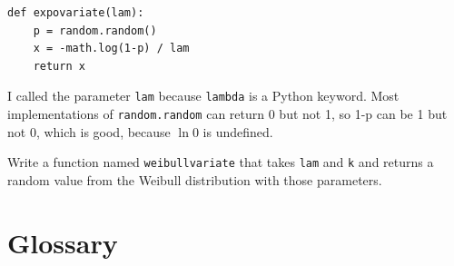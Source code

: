 \documentclass[12pt]{book}
\begin{document}
\begin{verbatim}
def expovariate(lam):
    p = random.random()
    x = -math.log(1-p) / lam
    return x
\end{verbatim}

I called the parameter \verb"lam" because \verb"lambda" is a Python
keyword.  Most implementations of {\tt random.random} can return 0 but
not 1, so 1-p can be 1 but not 0, which is good, because $\ln 0$ is
undefined.


\begin{ex}


Write a function named \verb"weibullvariate" that takes
\verb"lam" and \verb"k" and returns a random value from the Weibull
distribution with those parameters.


\end{ex}


\section{Glossary}
\end{document}
